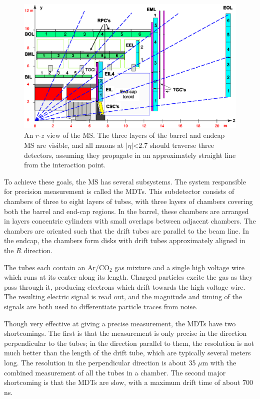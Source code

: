 \begin{centering}
\begin{figure}[bth]
\myfloatalign
\includegraphics[width=.90\linewidth]{figures/atlas/Muon_rz_large_sect_6.eps}
\caption{An $r$-$z$ view of the \ac{MS}. The three layers of the barrel and endcap \ac{MS} are visible, and all muons at $|\eta|$<2.7 should traverse three detectors, assuming they propagate in an approximately straight line from the interaction point.}
\label{fig:muon_rz}
\end{figure}
\end{centering}

To achieve these goals, the \ac{MS} has several subsystems. The system responsible for precision measurement is called the \acfp{MDT}. This subdetector consists of chambers of three to eight layers of tubes, with three layers of chambers covering both the barrel and end-cap regions. In the barrel, these chambers are arranged in layers concentric cylinders with small overlaps between adjacent chambers. The chambers are oriented such that the drift tubes are parallel to the beam line. In the endcap, the chambers form disks with drift tubes approximately aligned in the $R$ direction. 

The tubes each contain an Ar/CO$_2$ gas mixture and a single high voltage wire which runs at its center along its length. Charged particles excite the gas as they pass through it, producing electrons which drift towards the high voltage wire. The resulting electric signal is read out, and the magnitude and timing of the signals are both used to differentiate particle traces from noise. 

Though very effective at giving a precise measurement, the \acp{MDT} have two shortcomings. The first is that the measurement is only precise in the direction perpendicular to the tubes; in the direction parallel to them, the resolution is not much better than the length of the drift tube, which are typically several meters long. The resolution in the perpendicular direction is about 35 $\mu$m with the combined measurement of all the tubes in a chamber. The second major shortcoming is that the \acp{MDT} are slow, with a maximum drift time of about 700 ns. 

